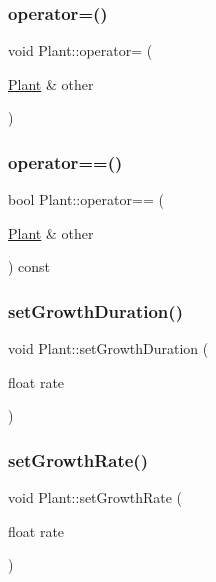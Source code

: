 \mbox{\label{class_plant_a10e2417c9c0e750666146443e76623ee}} 
\subsubsection{\texorpdfstring{operator=()}{operator=()}}
{\footnotesize\ttfamily void Plant\+::operator= (\begin{DoxyParamCaption}\item[{\mbox{\hyperlink{class_plant}{Plant}} \&}]{other }\end{DoxyParamCaption})}

\mbox{\label{class_plant_abe475b0daf524526b9680274ea0f8e2b}} 
\subsubsection{\texorpdfstring{operator==()}{operator==()}}
{\footnotesize\ttfamily bool Plant\+::operator== (\begin{DoxyParamCaption}\item[{\mbox{\hyperlink{class_plant}{Plant}} \&}]{other }\end{DoxyParamCaption}) const}

\mbox{\label{class_plant_a3baeabf1c11ff1440b696cfe34f785f5}} 
\subsubsection{\texorpdfstring{set\+Growth\+Duration()}{setGrowthDuration()}}
{\footnotesize\ttfamily void Plant\+::set\+Growth\+Duration (\begin{DoxyParamCaption}\item[{float}]{rate }\end{DoxyParamCaption})}

\mbox{\label{class_plant_af55fc2a9b7b3833ecc305f7fe19fd5dd}} 
\subsubsection{\texorpdfstring{set\+Growth\+Rate()}{setGrowthRate()}}
{\footnotesize\ttfamily void Plant\+::set\+Growth\+Rate (\begin{DoxyParamCaption}\item[{float}]{rate }\end{DoxyParamCaption})}

